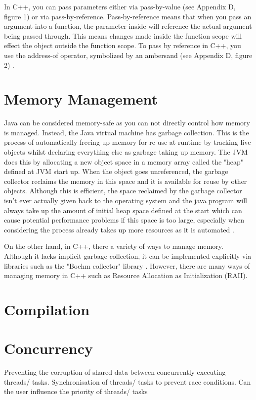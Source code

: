\documentclass[]{report}
\begin{document}
In C++, you can pass parameters either via pass-by-value (see Appendix D, figure 1) or via pass-by-reference. Pass-by-reference means that when you pass an argument into a function, the parameter inside will reference the actual argument being passed through. This means changes made inside the function scope will effect the object outside the function scope. To pass by reference in C++, you use the address-of operator, symbolized by an ambersand (see Appendix D, figure 2) \cite{ParametersC++}.

\section{Memory Management}
Java can be considered memory-safe as you can not directly control how memory is managed. Instead, the Java virtual machine has garbage collection. This is the process of automatically freeing up memory for re-use at runtime by tracking live objects whilst declaring everything else as garbage taking up memory. The JVM does this by allocating a new object space in a memory array called the "heap" defined at JVM start up. When the object goes unreferenced, the garbage collector  reclaims the memory in this space and it is available for reuse by other objects. Although this is efficient, the space reclaimed by the garbage collector isn't ever actually given back to the operating system and the java program will always take up the amount of initial heap space defined at the start which can cause potential performance problems if this space is too large, especially when considering the process already takes up more resources as it is automated \cite{MemoryJava}.

On the other hand, in C++, there a variety of ways to manage memory. Although it lacks implicit garbage collection, it can be implemented explicitly via libraries such as the "Boehm collector" library \cite{Boehm}. However, there are many ways of managing memory in C++ such as Resource Allocation as Initialization (RAII).

\section{Compilation}

\section{Concurrency}
Preventing the corruption of shared data between
concurrently executing threads/ tasks.
Synchronisation of threads/ tasks to prevent race
conditions.
Can the user influence the priority of threads/ tasks
\end{document}
